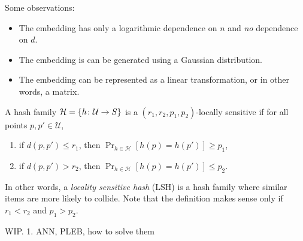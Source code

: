\documentclass{article}
\begin{document}
Some observations:
\begin{itemize}
  \item The embedding has only a logarithmic dependence on $n$ and \emph{no} dependence on $d$.
  \item The embedding is can be generated using a Gaussian distribution.
  \item The embedding can be represented as a linear transformation, or in other words, a matrix.
\end{itemize}

\begin{definition}
  A hash family $\mathcal{H} = \{h \colon \mathcal{U} \to S\}$ is a $(r_1, r_2, p_1, p_2)$-locally sensitive if for all points $p, p' \in \mathcal{U}$,

  \begin{enumerate}
    \item if $d(p, p') \le r_1$, then $\Pr_{h \in \mathcal{H}}[h(p) = h(p')] \ge p_1$,
    \item if $d(p, p') > r_2$, then $\Pr_{h \in \mathcal{H}}[h(p) = h(p')] \le p_2$.
  \end{enumerate}

\end{definition}
In other words, a \emph{locality sensitive hash} (LSH) is a hash family where similar items are more likely to collide.
Note that the definition makes sense only if $r_1 < r_2$ and $p_1 > p_2$.

WIP.
1. ANN, PLEB, how to solve them
\end{document}
